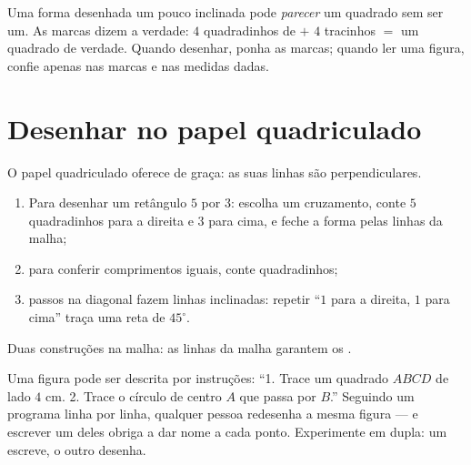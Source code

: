 \begin{example}\label{ex:g3:shapes:marks}
Uma forma desenhada um pouco inclinada pode \emph{parecer} um
quadrado sem ser um. As marcas dizem a verdade: $4$ quadradinhos de
 $+$ $4$ tracinhos $=$ um quadrado de verdade. Quando
desenhar, ponha as marcas; quando ler uma figura, confie apenas nas
marcas e nas medidas dadas.
\end{example}

\section{Desenhar no papel quadriculado}

\begin{method}\label{met:g3:shapes:grid}
O papel quadriculado oferece  de graça: as suas linhas
são perpendiculares.
\begin{enumerate}
  \item Para desenhar um retângulo $5$ por $3$: escolha um cruzamento,
        conte $5$ quadradinhos para a direita e $3$ para cima, e feche
        a forma pelas linhas da malha;
  \item para conferir comprimentos iguais, conte quadradinhos;
  \item passos na diagonal fazem linhas inclinadas: repetir ``$1$
        para a direita, $1$ para cima'' traça uma reta de
        $45^\circ$.
\end{enumerate}
\end{method}

\begin{omfigure}

{\small Duas construções na malha: as linhas da malha garantem os
.}
\end{omfigure}

\begin{example}\label{ex:g3:shapes:program}
Uma figura pode ser descrita por instruções: ``1. Trace um quadrado
$ABCD$ de lado $4$ cm. 2. Trace o círculo de centro $A$ que passa por
$B$.'' Seguindo um programa linha por linha, qualquer pessoa redesenha
a mesma figura --- e escrever um deles obriga a dar nome a cada
ponto. Experimente em dupla: um escreve, o outro desenha.
\end{example}

